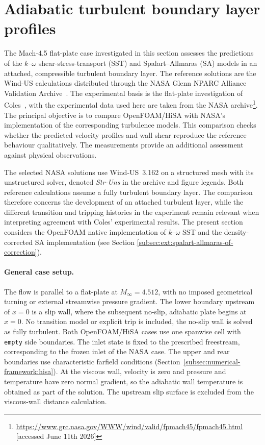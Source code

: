 \section{Adiabatic turbulent boundary layer profiles}
\label{sec:numerical-vv:adiabatic-turbulent-boundary-layer-profiles}

The Mach-4.5 flat-plate case investigated in this section assesses the predictions of the
\(k\)--\(\omega\) shear-stress-transport (SST) and Spalart--Allmaras (SA)
models in an attached, compressible turbulent boundary layer. The reference
solutions are the Wind-US calculations distributed through the NASA Glenn
NPARC Alliance Validation Archive~\citep{DippoldLenahan2012Mach45FlatPlate}.
The experimental basis is the flat-plate investigation of
Coles~\citep{Coles1953SupersonicFlatPlate}, with the experimental data used here
are taken from the NASA archive\footnote{\url{https://www.grc.nasa.gov/WWW/wind/valid/fpmach45/fpmach45.html} [accessed June 11th 2026]}. The principal objective is to compare
OpenFOAM/HiSA with NASA's implementation of the corresponding turbulence
models. This comparison checks whether the predicted velocity profiles and
wall shear reproduce the reference behaviour qualitatively. The measurements provide an
additional assessment against physical observations.
\par\medskip

The selected NASA solutions use Wind-US~3.162 on a structured mesh with its
unstructured solver, denoted \emph{Str-Uns} in the archive and figure legends.
Both reference calculations assume a fully turbulent boundary
layer. The comparison therefore concerns the development of an attached
turbulent layer, while the different transition and tripping histories in
the experiment remain relevant when interpreting agreement with Coles' experimental results.
The present section considers the OpenFOAM native implementation of \(k\)--\(\omega\) SST and the density-corrected SA implementation (see Section \ref{subsec:ext:spalart-allmaras-of-correction}).

\paragraph{General case setup.}

The flow is parallel to a flat-plate at \(M_\infty=4.512\), with no imposed
geometrical turning or external streamwise pressure gradient. The lower
boundary upstream of \(x=0\) is a slip wall, where the subsequent no-slip, adiabatic plate
begins at \(x=0\). No transition model or explicit trip is included, the no-slip wall is solved as fully turbulent. Both OpenFOAM/HiSA cases use one spanwise cell with \texttt{empty} side
boundaries. The inlet state is fixed to the prescribed freestream,
corresponding to the frozen inlet of the NASA case. The upper and rear boundaries use characteristic farfield conditions
(Section~\ref{subsec:numerical-framework:hisa}). At the viscous wall, velocity is zero and
pressure and temperature have zero normal gradient, so the adiabatic wall
temperature is obtained as part of the solution. The upstream slip surface
is excluded from the viscous-wall distance calculation.
\par\medskip

